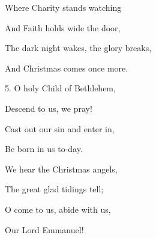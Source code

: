 \begin{description}[nosep,leftmargin=\parindent,labelsep=0pt]
\item Where Charity stands watching 
\item And Faith holds wide the door, 
\item The dark night wakes, the glory breaks, 
\item And Christmas comes once more. 
\vspace{1.5ex}
\item 5. O holy Child of Bethlehem, 
\item Descend to us, we pray! 
\item Cast out our sin and enter in, 
\item Be born in us to-day. 
\item We hear the Christmas angels, 
\item The great glad tidings tell; 
\item O come to us, abide with us, 
\item Our Lord Emmanuel! 
\end{description}
